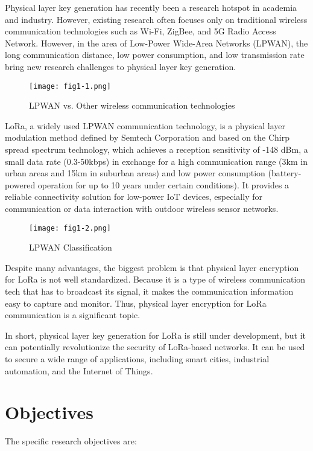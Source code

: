 Physical layer key generation has recently been a research hotspot in academia and industry\cite{7120014}. However, existing research often focuses only on traditional wireless communication technologies such as Wi-Fi, ZigBee, and 5G Radio Access Network. However, in the area of Low-Power Wide-Area Networks (LPWAN)\cite{iotfactorylpwan}, the long communication distance, low power consumption, and low transmission rate bring new research challenges to physical layer key generation.
\begin{figure}
  \centering
  \texttt{[image: fig1-1.png]}
  \caption{LPWAN vs. Other wireless communication technologies\cite{iotfactorylpwan}}
  \label{fig:1-1}
\end{figure}
LoRa, a widely used LPWAN communication technology, is a physical layer modulation method defined by Semtech Corporation and based on the Chirp spread spectrum technology, which achieves a reception sensitivity of -148 dBm, a small data rate (0.3-50kbps) in exchange for a high communication range (3km in urban areas and 15km in suburban areas) and low power consumption (battery-powered operation for up to 10 years under certain conditions)\cite{lorawanpara}. It provides a reliable connectivity solution for low-power IoT devices, especially for communication or data interaction with outdoor wireless sensor networks.
\begin{figure}
  \centering
  \texttt{[image: fig1-2.png]}
  \caption{LPWAN Classification}
  \label{fig:1-2}
\end{figure}
Despite many advantages, the biggest problem is that physical layer encryption for LoRa is not well standardized. Because it is a type of wireless communication tech that has to broadcast its signal, it makes the communication information easy to capture and monitor. Thus, physical layer encryption for LoRa communication is a significant topic. 

In short, physical layer key generation for LoRa is still under development, but it can potentially revolutionize the security of LoRa-based networks. It can be used to secure a wide range of applications, including smart cities, industrial automation, and the Internet of Things.

\section{Objectives}

The specific research objectives are:

